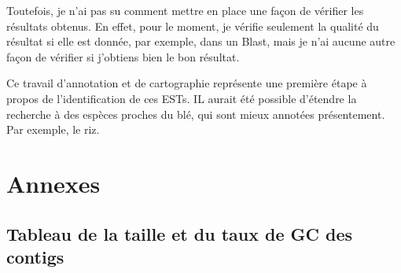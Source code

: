 \documentclass[10.9pt]{article} %
\renewcommand{\thesubsection}{\alph{subsection}}
\begin{document}
Toutefois, je n'ai pas su comment mettre en place une façon de vérifier les résultats obtenus. En effet, pour le moment, je vérifie
seulement la qualité du résultat si elle est donnée, par exemple, dans un Blast, mais je n'ai aucune autre façon de vérifier si
j'obtiens bien le bon résultat.

Ce travail d'annotation et de cartographie représente une première étape à propos de l'identification de ces ESTs. IL aurait été 
possible d'étendre la recherche à des espèces proches du blé, qui sont mieux annotées présentement. Par exemple, le riz.

\begingroup
\renewcommand{\appendix}{%
    \renewcommand{\thesubsection}{\arabic{subsection}}
}

\newpage
\appendix
\section{Annexes}

\subsection{Tableau de la taille et du taux de GC des contigs}\label{1}
\end{document}
